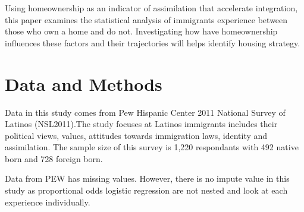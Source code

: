 \documentclass[11pt,]{article}
\begin{document}
Using homeownership as an indicator of assimilation that accelerate
integration, this paper examines the statistical analysis of immigrants
experience between those who own a home and do not. Investigating how
have homeownership influences these factors and their trajectories will
helps identify housing strategy.

\hypertarget{data-and-methods}{%
\section{Data and Methods}\label{data-and-methods}}

Data in this study comes from Pew Hispanic Center 2011 National Survey
of Latinos (NSL2011).The study focuses at Latinos immigrants includes
their political views, values, attitudes towards immigration laws,
identity and assimilation. The sample size of this survey is 1,220
respondants with 492 native born and 728 foreign born.

Data from PEW has missing values. However, there is no impute value in
this study as proportional odds logistic regression are not nested and
look at each experience individually.
\end{document}
